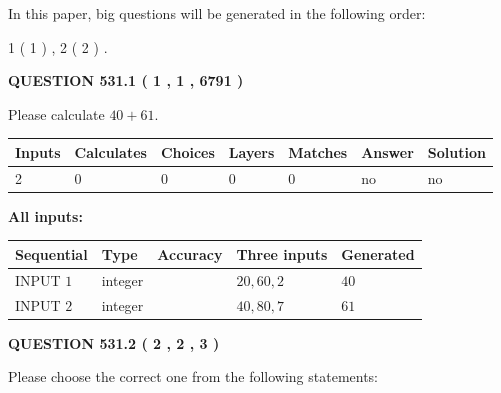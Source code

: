 \documentclass[12pt]{article}
\begin{document}
\vspace{0.2in}
   
In this paper, big questions will be generated in the following order: 
   
   
   1 ( 1 )
 ,
   2 ( 2 )
 .
  
\vspace{0.2in}
  
{\textbf{\Large{QUESTION
531.1 
 ( 1 , 1 , 6791 )
}}}
  
  
 
Please calculate $ %
40 +  %
61 $.
 
 
   
   
   
   
\noindent\begin{tabular}{|l|l|l|l|l|l|l|}
 \hline
Inputs & Calculates & Choices & Layers & Matches & Answer & Solution \\ \hline
 2  & 
 0  & 
 0
  & 
 0  & 
 0  & 
  no & 
  no 
  \\ \hline
 \end{tabular}
   
   
   
   
\noindent{}
   
   
   
   
\noindent\vspace{0.1in}\hspace{-0.08in} {\textbf{\Large{All inputs: }}}
   
   
  
  
\noindent\begin{tabular}{|l|l|l|l|l|}
\hline
 Sequential & Type & Accuracy & Three inputs & Generated \\ 
\hline
 
 
  INPUT $  1 $ & integer &  & $
 20
 , 
 60
 , 
 2
 $ & $ 40 $ 
 \\  \hline  
 
 
  INPUT $  2 $ & integer &  & $
 40
 , 
 80
 , 
 7
 $ & $ 61 $ 
 \\  \hline  
 \end{tabular}
   
   
  
\vspace{0.2in}
  
{\textbf{\Large{QUESTION
531.2 
 ( 2 , 2 , 3 )
}}}
  
  
Please choose the correct one from the following statements:
 
\end{document}
